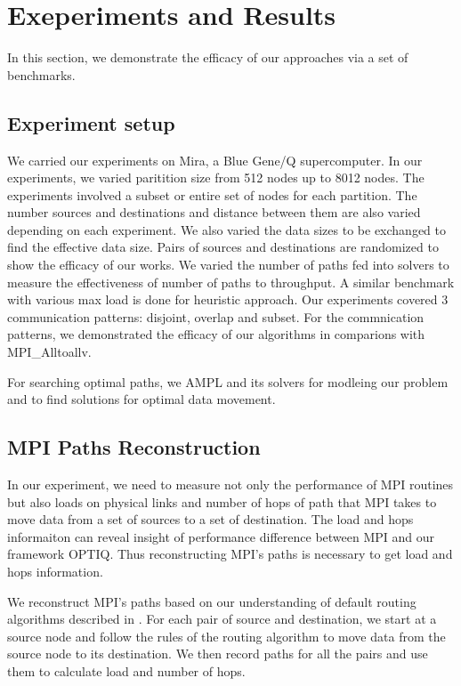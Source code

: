 \section{Exeperiments and Results}
\label{sec:benchmark}

In this section, we demonstrate the efficacy of our approaches via a set of benchmarks.



\subsection{Experiment setup}

We carried our experiments on Mira, a Blue Gene/Q supercomputer. In our experiments, we varied paritition size from 512 nodes up to 8012 nodes. The experiments involved a subset or entire set of nodes for each partition. The number sources and destinations and distance between them are also varied depending on each experiment. We also varied the data sizes to be exchanged to find the effective data size. Pairs of sources and destinations are randomized to show the efficacy of our works. We varied the number of paths fed into solvers to measure the effectiveness of number of paths to throughput. A similar benchmark with various max load is done for heuristic approach. Our experiments covered 3 communication patterns: disjoint, overlap and subset. For the commnication patterns, we demonstrated the efficacy of our algorithms in comparions with MPI\_Alltoallv.

For searching optimal paths, we AMPL and its solvers \cite{AMPL} for modleing our problem and to find solutions for optimal data movement.

\subsection{MPI Paths Reconstruction}

In our experiment, we need to measure not only the performance of MPI routines but also loads on physical links and number of hops of path that MPI takes to move data from a set of sources to a set of destination. The load and hops informaiton can reveal insight of performance difference between MPI and our framework OPTIQ. Thus reconstructing MPI's paths is necessary to get load and hops information.

We reconstruct MPI's paths based on our understanding of default routing algorithms described in \cite{Chen:BGQ}. For each pair of source and destination, we start at a source node and follow the rules of the routing algorithm to move data from the source node to its destination. We then record paths for all the pairs and use them to calculate load and number of hops. 

